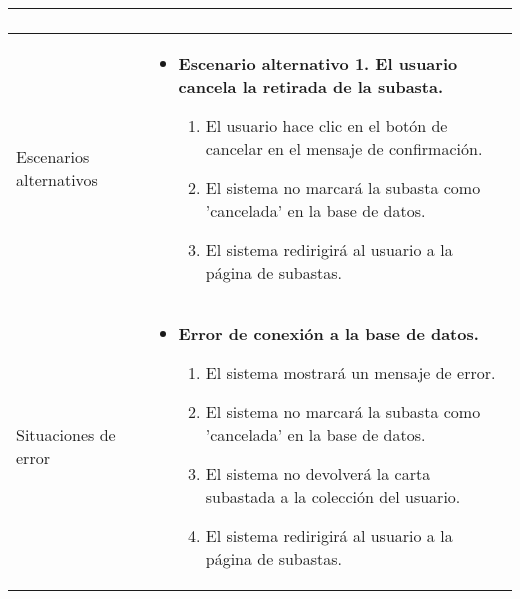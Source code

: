 \begin{longtable}{
    >{\columncolor{lightgreen!20}}p{4cm}
    p{12cm}
    }
\begin{enumerate}[nosep,leftmargin=*]
    \end{enumerate} \\
    \midrule
    Escenarios alternativos & 
    \begin{itemize}[nosep,leftmargin=*]
        \item \textbf{Escenario alternativo 1. El usuario cancela la retirada de la subasta.}
        \begin{enumerate}[nosep,leftmargin=*]
            \item El usuario hace clic en el botón de cancelar en el mensaje de confirmación.
            \item El sistema no marcará la subasta como 'cancelada' en la base de datos.
            \item El sistema redirigirá al usuario a la página de subastas.
        \end{enumerate}
    \end{itemize} \\
    \midrule
    Situaciones de error & 
    \begin{itemize}[nosep,leftmargin=*]
        \item \textbf{Error de conexión a la base de datos.}
        \begin{enumerate}[nosep,leftmargin=*]
            \item El sistema mostrará un mensaje de error.
            \item El sistema no marcará la subasta como 'cancelada' en la base de datos.
            \item El sistema no devolverá la carta subastada a la colección del usuario.
            \item El sistema redirigirá al usuario a la página de subastas.
        \end{enumerate}
    \end{itemize} \\
\end{longtable}




